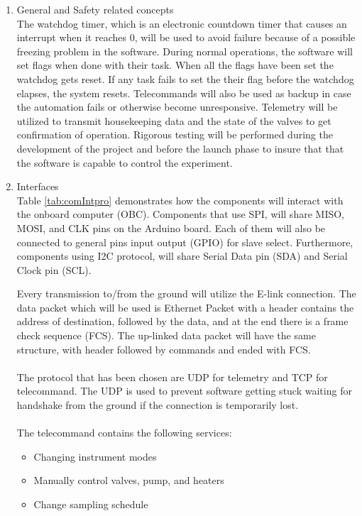 \begin{enumerate}[label=(\alph*)]
\item{General and Safety related concepts}\\
The watchdog timer, which is an electronic countdown timer that causes an interrupt when it reaches 0, will be used to avoid failure because of a possible freezing problem in the software. During normal operations, the software will set flags when done with their task. When all the flags have been set the watchdog gets reset. If any task fails to set the their flag before the watchdog elapses, the system resets. Telecommands will also be used as backup in case the automation fails or otherwise become unresponsive. Telemetry will be utilized to transmit housekeeping data and the state of the valves to get confirmation of operation. Rigorous testing will be performed during the development of the project and before the launch phase to insure that that the software is capable to control the experiment.
\item{Interfaces}\\
Table \ref{tab:comIntpro} demonstrates how the components will interact with the onboard computer (OBC). Components that use SPI, will share MISO, MOSI, and CLK pins on the Arduino board. Each of them will also be connected to general pins input output (GPIO) for slave select. Furthermore, components using I2C protocol, will share Serial Data pin (SDA) and Serial Clock pin (SCL).



Every transmission to/from the ground will utilize the E-link connection. The data packet which will be used is Ethernet Packet with a header contains the address of destination, followed by the data, and at the end there is a frame check sequence (FCS). The up-linked data packet will have the same structure, with header followed by commands and ended with FCS.\\
\\
The protocol that has been chosen are UDP for telemetry and TCP for telecommand. The UDP is used to prevent software getting stuck waiting for handshake from the ground if the connection is temporarily lost.\\
\\
The telecommand contains the following services:
\begin{itemize}
    \item Changing instrument modes
    \item Manually control valves, pump, and heaters
    \item Change sampling schedule
\end{itemize}


\end{enumerate}
